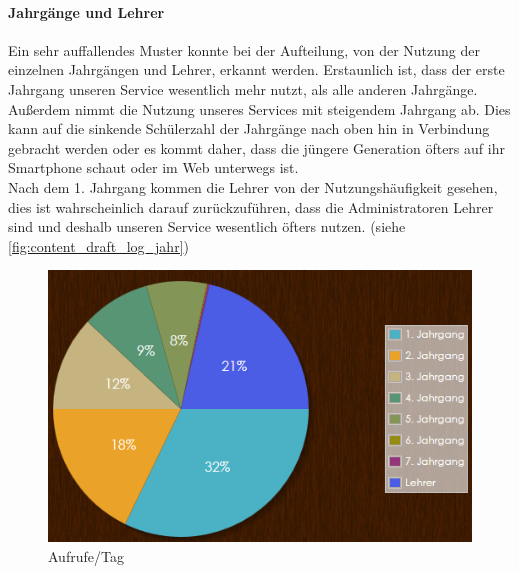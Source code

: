\paragraph{Jahrgänge und Lehrer\\}
Ein sehr auffallendes Muster konnte bei der Aufteilung, von der Nutzung der einzelnen Jahrgängen und Lehrer, erkannt werden. Erstaunlich ist, dass der erste Jahrgang unseren Service wesentlich mehr nutzt, als alle anderen Jahrgänge. Außerdem nimmt die Nutzung unseres Services mit steigendem Jahrgang ab. Dies kann auf die sinkende Schülerzahl der Jahrgänge nach oben hin in Verbindung gebracht werden oder es kommt daher, dass die jüngere Generation öfters auf ihr Smartphone schaut oder im Web unterwegs ist.\\
Nach dem 1. Jahrgang kommen die Lehrer von der Nutzungshäufigkeit gesehen, dies ist wahrscheinlich darauf zurückzuführen, dass die Administratoren Lehrer sind und deshalb unseren Service wesentlich öfters nutzen. (siehe \autoref{fig:content_draft_log_jahr})

\begin{figure}[H]
\centering
\includegraphics[keepaspectratio=true, width=12cm]{images/screenshots/statistics/jahrgang.png}
\caption{Aufrufe/Tag}
\label{fig:content_draft_log_jahr}
\end{figure}